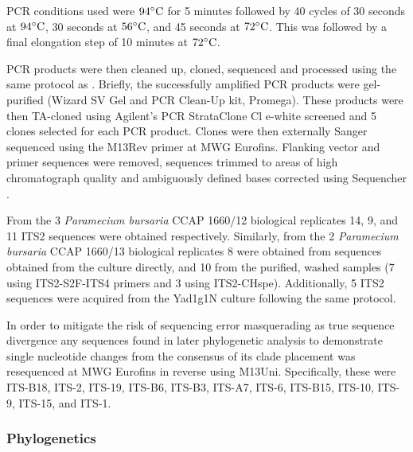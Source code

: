 PCR conditions used were \(94\celsius\) for 5 minutes followed by
40 cycles of 30 seconds at \(94\celsius\), 30 seconds at \(56\celsius\),
and 45 seconds at \(72\celsius\). This was followed by a final
elongation step of 10 minutes at \(72\celsius\).

PCR products were then cleaned up, cloned, sequenced
and processed using the same protocol as \citep{Maguire2014a}.
Briefly, the successfully amplified PCR products were gel-purified 
(Wizard SV Gel and PCR Clean-Up kit, Promega).
These products were then TA-cloned 
using Agilent's PCR StrataClone Cl e-white screened and 5 clones
selected for each PCR product.  
Clones were then externally Sanger sequenced using the M13Rev primer
at MWG Eurofins. 
Flanking vector and primer sequences were removed, sequences trimmed to 
areas of high chromatograph quality and ambiguously defined bases corrected
using Sequencher \citep{Sequencher}.

From the 3 \textit{Paramecium bursaria} CCAP 1660/12 biological replicates
14, 9, and 11 ITS2 sequences were obtained respectively.
Similarly, from the 2 \textit{Paramecium bursaria} CCAP 1660/13 biological replicates
8 were obtained from sequences obtained from the culture directly, and 10
from the purified, washed samples (7 using ITS2-S2F-ITS4 primers and 3 using
ITS2-CHspe).  Additionally, 5 ITS2 sequences were acquired from the Yad1g1N
culture following the same protocol. 

In order to mitigate the risk of sequencing error masquerading
as true sequence divergence any sequences found in later phylogenetic
analysis to demonstrate single nucleotide changes from the consensus
of its clade placement was resequenced at MWG Eurofins in reverse 
using M13Uni.  Specifically, these were ITS-B18,
ITS-2, ITS-19, ITS-B6, ITS-B3, ITS-A7, ITS-6, ITS-B15,
ITS-10, ITS-9, ITS-15, and ITS-1.


%

\subsubsection{Phylogenetics}

